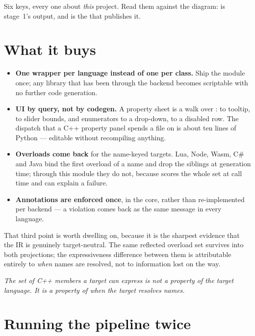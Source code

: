 Six keys, every one about \emph{this} project. Read them against the diagram:
 is stage~1's output, and  is the
 that publishes it.

\section{What it buys}

\begin{itemize}
  \item \textbf{One wrapper per language instead of one per class.} Ship the
    module once; any library that has been through the  backend
    becomes scriptable with no further code generation.
  \item \textbf{UI by query, not by codegen.} A property sheet is a walk over
    :  to tooltip,  to slider bounds,
     and enumerators to a drop-down,  to a
    disabled row. The dispatch that a C++ property panel spends a file on is
    about ten lines of Python --- editable without recompiling anything.
  \item \textbf{Overloads come back} for the name-keyed targets. Lua, Node,
    Wasm, C\# and Java bind the first overload of a name and drop the siblings
    at generation time; through this module they do not, because
     scores the whole set at call time and can explain a
    failure.
  \item \textbf{Annotations are enforced once}, in the core, rather than
    re-implemented per backend --- a  violation comes back as the
    same message in every language.
\end{itemize}

That third point is worth dwelling on, because it is the sharpest evidence that
the IR is genuinely target-neutral. The same reflected overload set survives
into both projections; the expressiveness difference between them is
attributable entirely to \emph{when} names are resolved, not to information
lost on the way.

\begin{center}
\emph{The set of C++ members a target can express is not a property of the
target language. It is a property of when the target resolves names.}
\end{center}

\section{Running the pipeline twice}

